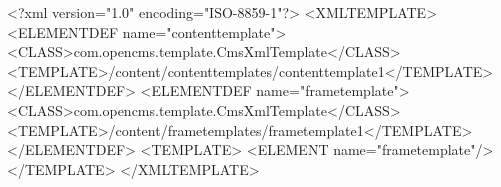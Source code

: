 <?xml version="1.0" encoding="ISO-8859-1"?> 
<XMLTEMPLATE>
    <ELEMENTDEF name="contenttemplate">
        <CLASS>com.opencms.template.CmsXmlTemplate</CLASS>
        <TEMPLATE>/content/contenttemplates/contenttemplate1</TEMPLATE>
    </ELEMENTDEF>
    <ELEMENTDEF name="frametemplate">
        <CLASS>com.opencms.template.CmsXmlTemplate</CLASS>
        <TEMPLATE>/content/frametemplates/frametemplate1</TEMPLATE>
    </ELEMENTDEF>
<TEMPLATE> <ELEMENT name="frametemplate"/> </TEMPLATE>
</XMLTEMPLATE>
